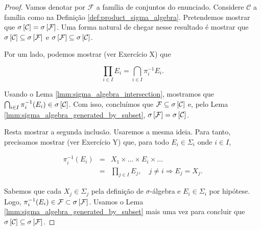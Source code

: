 \begin{proof}
    Vamos denotar por $\mathcal{F}$ a família de conjuntos do enunciado. Considere $\mathcal{C}$ a família como na Definição \ref{def:product_sigma_algebra}. Pretendemos mostrar que  $\sigma \left[\mathcal{C}\right]=\sigma \left[\mathcal{F}\right]$. Uma forma natural de chegar nesse resultado é mostrar que $\sigma \left[\mathcal{C}\right]\subseteq\sigma \left[\mathcal{F}\right]$ e $\sigma \left[\mathcal{F}\right]\subseteq\sigma \left[\mathcal{C}\right]$.
    
    Por um lado, podemos mostrar (ver Exercício X) que
    
    \begin{equation*}
        \prod_{i\in I} E_i = \bigcap_{i\in I} \pi_{i}^{-1} E_i.
    \end{equation*}
    
    Usando o Lema \ref{lmm:sigma_algebra_intersection}, mostramos que $\bigcap_{i\in I} \pi_{i}^{-1} (E_i) \in \sigma \left[\mathcal{C}\right]$. Com isso, concluímos que $\mathcal{F} \subseteq \sigma \left[\mathcal{C}\right]$ e, pelo Lema \ref{lmm:sigma_algebra_generated_by_subset}, $\sigma \left[\mathcal{F}\right]=\sigma \left[\mathcal{C}\right]$.
    
    Resta mostrar a segunda inclusão. Usaremos a mesma ideia. Para tanto, precisamos mostrar (ver Exercício Y) que, para todo $E_i\in\Sigma_i$ onde $i\in I$,
    
    \begin{eqnarray*}
        \pi_{i}^{-1} (E_i) 
        &=& X_1 \times \dots \times E_i \times\dots \\
        &=& \prod_{j\in I} E_j, \quad j\neq i \Rightarrow E_j=X_j.
    \end{eqnarray*}
    
    Sabemos que cada $X_j\in\Sigma_j$ pela definição de $\sigma$-álgebra e $E_i\in\Sigma_i$ por hipótese. Logo, $\pi_{i}^{-1} (E_i) \in \mathcal{F} \subset \sigma \left[\mathcal{F}\right]$. Usamos o Lema \ref{lmm:sigma_algebra_generated_by_subset} mais uma vez para concluir que $\sigma \left[\mathcal{C}\right]\subseteq\sigma \left[\mathcal{F}\right]$.
\end{proof}